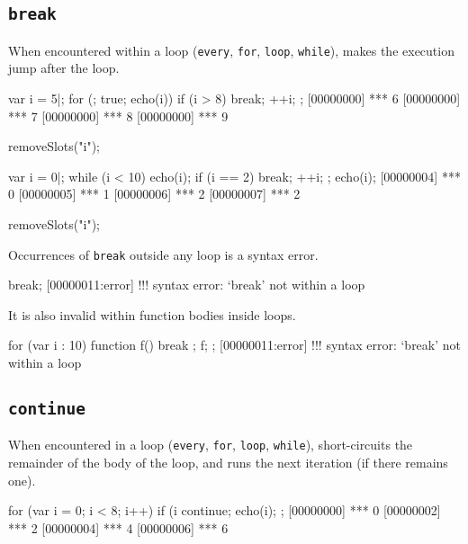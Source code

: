 \subsection{\lstinline{break}}
\label{sec:lang:break}

When encountered within a loop (\lstinline{every}, \lstinline{for},
\lstinline{loop}, \lstinline{while}),  makes the execution
jump after the loop.

\begin{urbiscript}
var i = 5|;
for (; true; echo(i))
{
  if (i > 8)
    break;
  ++i;
};
[00000000] *** 6
[00000000] *** 7
[00000000] *** 8
[00000000] *** 9
\end{urbiscript}
\begin{urbicomment}
removeSlots("i");
\end{urbicomment}

\begin{urbiscript}
var i = 0|;
while (i < 10)
{
  echo(i);
  if (i == 2)
    break;
  ++i;
};
echo(i);
[00000004] *** 0
[00000005] *** 1
[00000006] *** 2
[00000007] *** 2
\end{urbiscript}
\begin{urbicomment}
removeSlots("i");
\end{urbicomment}

Occurrences of \lstinline{break} outside any loop is a syntax error.

\begin{urbiscript}
break;
[00000011:error] !!! syntax error: `break' not within a loop
\end{urbiscript}

It is also invalid within function bodies inside loops.

\begin{urbiscript}
for (var i : 10)
{
  function f() { break };
  f;
};
[00000011:error] !!! syntax error: `break' not within a loop
\end{urbiscript}


\subsection{\lstinline{continue}}
\label{sec:lang:continue}

When encountered in a loop (\lstinline{every}, \lstinline{for},
\lstinline{loop}, \lstinline{while}),  short-circuits the
remainder of the body of the loop, and runs the next iteration (if there
remains one).

\begin{urbiscript}
for (var i = 0; i < 8; i++)
{
  if (i %
    continue;
  echo(i);
};
[00000000] *** 0
[00000002] *** 2
[00000004] *** 4
[00000006] *** 6
\end{urbiscript}

